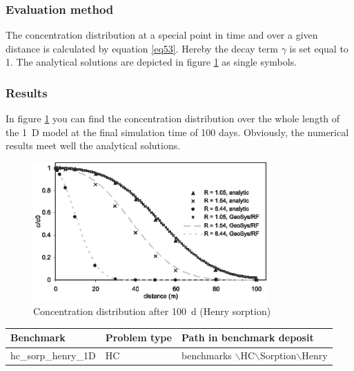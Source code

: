 \subsubsection*{Evaluation method}

The concentration distribution at a special point in time and over a given distance is calculated by equation \ref{eq53}. Hereby the decay term $\gamma$ is set equal to 1. The analytical solutions are depicted in figure \ref{fig53} as single symbols.

\subsubsection*{Results}

In figure \ref{fig53} you can find the concentration distribution over the whole length of the 1~D model at the final simulation time of 100 days. Obviously, the numerical results meet well the analytical solutions.


\begin{figure}[htbp]
\centering
\includegraphics[width=0.8\textwidth]{C/figures/fig53.eps}
\caption{Concentration distribution after 100~d (Henry sorption)}
\label{fig53}
\end{figure}

\begin{tabular}{|l|l|l|}
\hline
Benchmark & Problem type	& Path in benchmark deposit \\
\hline	
hc\_sorp\_henry\_1D	& HC	& benchmarks $\backslash$HC$\backslash$Sorption$\backslash$Henry \\
\hline	
\end{tabular}
